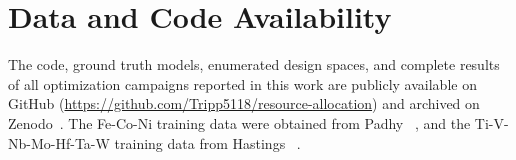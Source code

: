 \section*{Data and Code Availability}
The code, ground truth models, enumerated design spaces, and complete results of all optimization campaigns reported in this work are publicly available on GitHub (\url{https://github.com/Tripp5118/resource-allocation}) and archived on Zenodo~\cite{robinson2026agentic}. The Fe-Co-Ni training data were obtained from Padhy \etal~\cite{padhy2024experimentally, padhy2024data}, and the Ti-V-Nb-Mo-Hf-Ta-W training data from Hastings \etal~\cite{hastings2025leveraging}.
